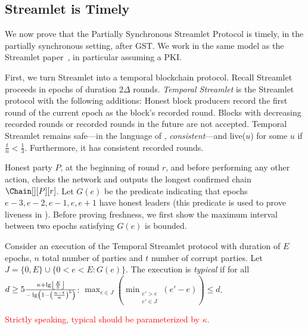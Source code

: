 \subsection{Streamlet is Timely}

We now prove that the Partially Synchronous Streamlet Protocol is timely,
in the partially synchronous setting, after GST.
We work in the same model as the Streamlet paper~\cite{streamlet},
in particular assuming a PKI.

First, we turn Streamlet into a temporal blockchain protocol.
Recall Streamlet proceeds in epochs of duration $2\Delta$ rounds.
\emph{Temporal Streamlet} is the Streamlet protocol with the
following additions: Honest block producers record the first round of the current epoch as the block's recorded round.
Blocks with decreasing recorded rounds or recorded rounds in the future are not accepted.
Temporal Streamlet remains safe---in the language of \cite{streamlet}, \emph{consistent}---and live($u$) for some $u$
if $\frac{t}{n} < \frac{1}{3}$. Furthermore, it has consistent recorded rounds.

Honest party $P$, at the beginning of round $r$, and
before performing any other action, checks the network and
outputs the longest confirmed chain $\Chain[][P][r]$.
Let $G(e)$ be the predicate indicating that epochs $e-3,e-2,e-1,e,e+1$ have honest leaders (this predicate is used to prove liveness in \cite{streamlet}).
Before proving freshness, we first show the maximum interval between two epochs satisfying $G(e)$ is bounded.

\begin{definition}
  Consider an execution of the Temporal Streamlet protocol with duration
  of $E$ epochs, $n$ total number of parties and $t$ number of corrupt parties.
  Let $J = \{0,E\} \cup \{0 < e < E: G(e)\}$.
  The execution is \emph{typical} if for all
  $d \geq 5\frac{\kappa + \lg \floor*{\frac{E}{5}}}{- \lg \left(1 - \left(\frac{n - t}{n}\right)^5\right)}$:
  $\max_{e \in J}(\min_{\substack{e' > e \\ e' \in J}}(e' - e)) \leq d$.
\end{definition}

\textcolor{red}{Strictly speaking, typical should be parameterized by $\kappa$.}

